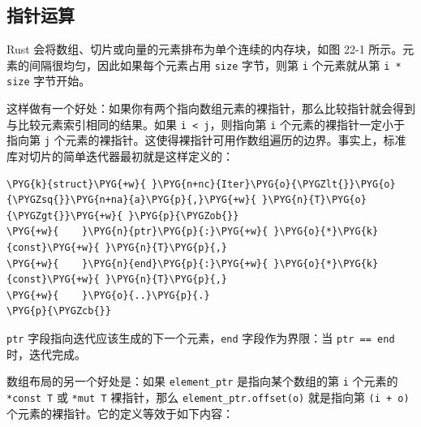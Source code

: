 \subsection{指针运算}

Rust 会将数组、切片或向量的元素排布为单个连续的内存块，如图 22-1 所示。元素的间隔很均匀，因此如果每个元素占用 \texttt{size} 字节，则第 \texttt{i} 个元素就从第 \texttt{i * size} 字节开始。


这样做有一个好处：如果你有两个指向数组元素的裸指针，那么比较指针就会得到与比较元素索引相同的结果。如果 \texttt{i < j}，则指向第 \texttt{i} 个元素的裸指针一定小于指向第 \texttt{j} 个元素的裸指针。这使得裸指针可用作数组遍历的边界。事实上，标准库对切片的简单迭代器最初就是这样定义的：

\begin{Verbatim}[commandchars=\\\{\},breaklines=true,breakanywhere=true,fontsize=\codefont,xleftmargin=17bp]
\PYG{k}{struct}\PYG{+w}{ }\PYG{n+nc}{Iter}\PYG{o}{\PYGZlt{}}\PYG{o}{\PYGZsq{}}\PYG{n+na}{a}\PYG{p}{,}\PYG{+w}{ }\PYG{n}{T}\PYG{o}{\PYGZgt{}}\PYG{+w}{ }\PYG{p}{\PYGZob{}}
\PYG{+w}{    }\PYG{n}{ptr}\PYG{p}{:}\PYG{+w}{ }\PYG{o}{*}\PYG{k}{const}\PYG{+w}{ }\PYG{n}{T}\PYG{p}{,}
\PYG{+w}{    }\PYG{n}{end}\PYG{p}{:}\PYG{+w}{ }\PYG{o}{*}\PYG{k}{const}\PYG{+w}{ }\PYG{n}{T}\PYG{p}{,}
\PYG{+w}{    }\PYG{o}{..}\PYG{p}{.}
\PYG{p}{\PYGZcb{}}
\end{Verbatim}

\texttt{ptr} 字段指向迭代应该生成的下一个元素，\texttt{end} 字段作为界限：当 \texttt{ptr == end} 时，迭代完成。

数组布局的另一个好处是：如果 \texttt{element\_ptr} 是指向某个数组的第 \texttt{i} 个元素的 \texttt{*const T} 或 \texttt{*mut T} 裸指针，那么 \texttt{element\_ptr.offset(o)} 就是指向第 \texttt{(i + o)} 个元素的裸指针。它的定义等效于如下内容：

